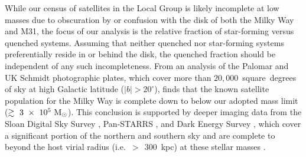 \documentclass[usenatbib]{mn2e}
\newcommand{\msun}{{\rm M}_{\odot}}
\begin{document}
While our census of satellites in the Local Group is likely incomplete
at low masses due to obscuration by or confusion with the disk of both
the Milky Way and M31, the focus of our analysis is the relative
fraction of star-forming versus quenched systems. Assuming that
neither quenched nor star-forming systems preferentially reside in or
behind the disk, the quenched fraction should be independent of any
such incompleteness. From an analysis of the Palomar and UK Schmidt
photographic plates, which cover more than $20,000$~square~degrees of
sky at high Galactic latitude ($|b| > 20^{\circ}$), \citet{irwin94}
finds that the known satellite population for the Milky Way is
complete down to below our adopted mass limit
($\gtrsim~3~\times~10^{5}~\msun$). This conclusion is supported by
deeper imaging data from the Sloan Digital Sky Survey
\citep[SDSS,][]{york00}, Pan-STARRS \citep{kaiser10}, and Dark Energy
Survey \citep[DES,][]{DES14}, which cover a significant portion of the
northern and southern sky and are complete to beyond the host virial
radius (i.e.~$>~\!~300$~kpc) at these stellar masses
\citep{tollerud08, koposov08, laevens14, koposov15, DES15}.
\end{document}
